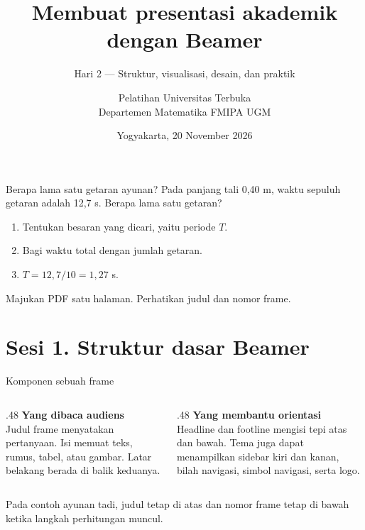 \documentclass[aspectratio=169,11pt]{beamer}
\title{Membuat presentasi akademik dengan Beamer}
\subtitle{Hari 2 --- Struktur, visualisasi, desain, dan praktik}
\author[Pelatihan UT dan UGM]{Pelatihan Universitas Terbuka\\[2pt]Departemen Matematika FMIPA UGM}
\date{Yogyakarta, 20 November 2026}
\begin{document}
\begin{frame}{Berapa lama satu getaran ayunan?}
Pada panjang tali 0,40 m, waktu sepuluh getaran adalah 12,7 s.
Berapa lama satu getaran?
\begin{enumerate}
\item<1-> Tentukan besaran yang dicari, yaitu periode $T$.
\item<2-> Bagi waktu total dengan jumlah getaran.
\item<3-> $T=12{,}7/10=1{,}27$ s.
\end{enumerate}
\small Majukan PDF satu halaman. Perhatikan judul dan nomor frame.
\end{frame}
  \begin{frame}[plain]\titlepage  \end{frame}
\section{Sesi 1. Struktur dasar Beamer}
\begin{frame}{Komponen sebuah frame}
\begin{columns}[T,onlytextwidth]
\begin{column}{.48\textwidth}
\textbf{Yang dibaca audiens}\\[3pt]
Judul frame menyatakan pertanyaan. Isi memuat teks, rumus, tabel, atau gambar. Latar belakang berada di balik keduanya.
\end{column}
\begin{column}{.48\textwidth}
\textbf{Yang membantu orientasi}\\[3pt]
Headline dan footline mengisi tepi atas dan bawah. Tema juga dapat menampilkan sidebar kiri dan kanan, bilah navigasi, simbol navigasi, serta logo.
\end{column}
\end{columns}
\bigskip
Pada contoh ayunan tadi, judul tetap di atas dan nomor frame tetap di bawah ketika langkah perhitungan muncul.
\par{}
\end{frame}
\end{document}
